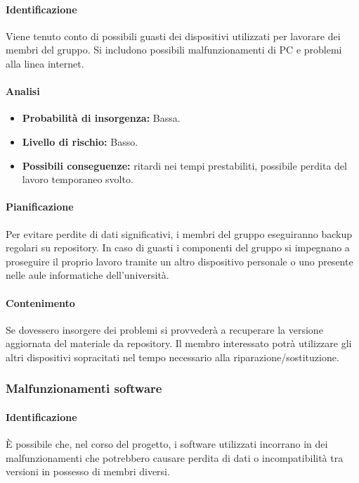 \paragraph {Identificazione}
Viene tenuto conto di possibili guasti dei dispositivi utilizzati per lavorare dei membri del gruppo. Si includono possibili malfunzionamenti di PC e problemi alla linea internet.

\paragraph {Analisi}
\begin{itemize}
	\item \textbf{Probabilità di insorgenza:} Bassa.
	\item \textbf{Livello di rischio:} Basso.
	\item \textbf{Possibili conseguenze:} ritardi nei tempi prestabiliti, possibile perdita del lavoro temporaneo svolto.
\end{itemize}

\paragraph {Pianificazione}
Per evitare perdite di dati significativi, i membri del gruppo eseguiranno backup regolari su repository. In caso di guasti i componenti del gruppo si impegnano a proseguire il proprio lavoro tramite un altro dispositivo personale o uno presente nelle aule informatiche dell'università.

\paragraph {Contenimento}
Se dovessero insorgere dei problemi si provvederà a recuperare la versione aggiornata del materiale da repository.	Il membro interessato potrà utilizzare gli altri dispositivi sopracitati nel tempo necessario alla riparazione/sostituzione.

\subsubsection{Malfunzionamenti software}
\paragraph {Identificazione}
È possibile che, nel corso del progetto, i software utilizzati incorrano in dei malfunzionamenti che potrebbero causare perdita di dati o incompatibilità tra versioni in possesso di membri diversi.

